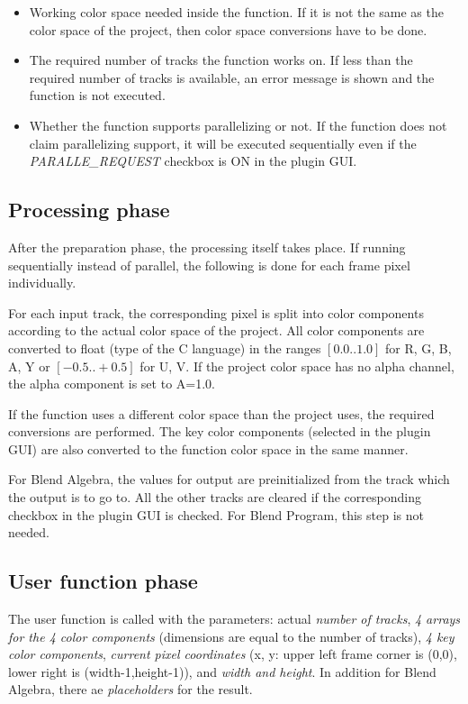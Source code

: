 \begin{itemize}
	\item Working color space needed inside the function. If it is not the same as the color space of the project, then color space conversions have to be done.
	\item The required number of tracks the function works on. If less than the required number of tracks is available, an error message is shown and the function is not executed.
	\item Whether the function supports parallelizing or not. If the function does not claim parallelizing support, it will be executed sequentially even if the \textit{PARALLE\_REQUEST} checkbox is ON in the plugin GUI.
\end{itemize}

\subsection{Processing phase}%
\label{processing_phase}

After the preparation phase, the processing itself takes place. If running sequentially instead of parallel, the following is done for each frame pixel individually.

For each input track, the corresponding pixel is split into color components according to the actual color space of the project. All color components are converted to float (type of the C language) in the ranges $[0.0 .. 1.0]$ for R, G, B, A, Y or $[-0.5 .. +0.5]$ for U, V. If the project color space has no alpha channel, the alpha component is set to A=1.0.

If the function uses a different color space than the project uses, the required conversions are performed. The key color components (selected in the plugin GUI) are also converted to the function color space in the same manner.

For Blend Algebra, the values for output are preinitialized from the track which the output is to go to. All the other tracks are cleared if the corresponding checkbox in the plugin GUI is checked. For Blend Program, this step is not needed.

\subsection{User function phase}%
\label{user_function_phase}

The user function is called with the parameters: actual \textit{number of tracks}, \textit{4 arrays for the 4 color components} (dimensions are equal to the number of tracks), \textit{4 key color components}, \textit{current pixel coordinates} (x, y: upper left frame corner is (0,0), lower right is (width-1,height-1)), and \textit{width and height}. In addition for Blend Algebra, there ae \textit{placeholders} for the result.

